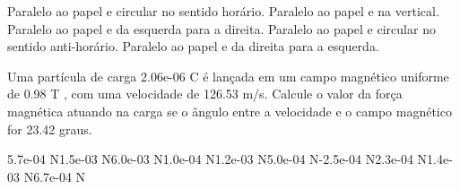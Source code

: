 \documentclass[12pt, addpoints]{exam}
\begin{document}
\begin{questions}
\begin{multicols*}{2}
        

\begin{choices}
\choice Paralelo ao papel e circular no sentido horário. 
\choice Paralelo ao papel e na vertical. 
\choice Paralelo ao papel e da esquerda para a direita. 
\choice Paralelo ao papel e circular no sentido anti-horário. 
\choice Paralelo ao papel e da direita para a esquerda. 
\end{choices}
\question Uma partícula de carga 2.06e-06 C é lançada em um campo magnético uniforme de    0.98 T , com uma velocidade de 126.53 m/s. Calcule o valor da força magnética atuando na carga se o ângulo entre a velocidade e o campo magnético for   23.42 graus.

\begin{oneparchoices}
\choice 5.7e-04 N\choice 1.5e-03 N\choice 6.0e-03 N\choice 1.0e-04 N\choice 1.2e-03 N\choice 5.0e-04 N\choice -2.5e-04 N\choice 2.3e-04 N\choice 1.4e-03 N\choice 6.7e-04 N
\end{oneparchoices}\end{multicols*}
\end{questions}
\newpage
\end{document}
